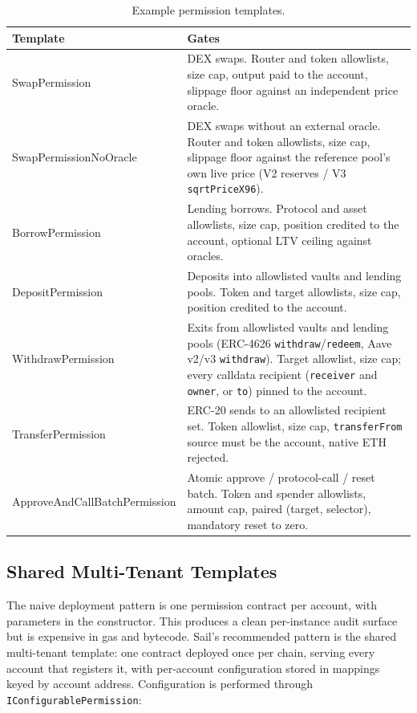 \documentclass[11pt]{article}
\begin{document}
\begin{table}[h]
\small
\centering
\begin{tabular}{@{}p{}p{}@{}}
\toprule
\textbf{Template} & \textbf{Gates} \\
\midrule
SwapPermission & DEX swaps. Router and token allowlists, size cap, output paid to the account, slippage floor against an independent price oracle. \\
\addlinespace[2pt]
SwapPermissionNoOracle & DEX swaps without an external oracle. Router and token allowlists, size cap, slippage floor against the reference pool's own live price (V2 reserves / V3 \texttt{sqrtPriceX96}). \\
\addlinespace[2pt]
BorrowPermission & Lending borrows. Protocol and asset allowlists, size cap, position credited to the account, optional LTV ceiling against oracles. \\
\addlinespace[2pt]
DepositPermission & Deposits into allowlisted vaults and lending pools. Token and target allowlists, size cap, position credited to the account. \\
\addlinespace[2pt]
WithdrawPermission & Exits from allowlisted vaults and lending pools (ERC-4626 \texttt{withdraw}/\texttt{redeem}, Aave v2/v3 \texttt{withdraw}). Target allowlist, size cap; every calldata recipient (\texttt{receiver} and \texttt{owner}, or \texttt{to}) pinned to the account. \\
\addlinespace[2pt]
TransferPermission & ERC-20 sends to an allowlisted recipient set. Token allowlist, size cap, \texttt{transferFrom} source must be the account, native ETH rejected. \\
\addlinespace[2pt]
ApproveAndCallBatchPermission & Atomic approve / protocol-call / reset batch. Token and spender allowlists, amount cap, paired (target, selector), mandatory reset to zero. \\
\bottomrule
\end{tabular}
\caption{Example permission templates.}
\end{table}

\subsection{Shared Multi-Tenant Templates}

The naive deployment pattern is one permission contract per account, with parameters in the constructor. This produces a clean per-instance audit surface but is expensive in gas and bytecode. Sail's recommended pattern is the shared multi-tenant template: one contract deployed once per chain, serving every account that registers it, with per-account configuration stored in mappings keyed by account address. Configuration is performed through \texttt{IConfigurablePermission}:
\end{document}
